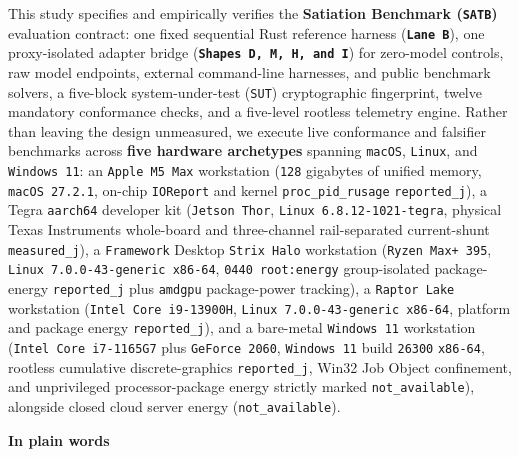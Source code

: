 \documentclass[10pt,letterpaper]{article}
\begin{document}
This study specifies and empirically verifies the \textbf{Satiation
Benchmark (\texttt{SATB})} evaluation contract: one fixed sequential
Rust reference harness (\textbf{\texttt{Lane\ B}}), one proxy-isolated
adapter bridge (\textbf{\texttt{Shapes\ D,\allowbreak{}\ M,\allowbreak{}\ H,\allowbreak{}\ and\ I}}) for
zero-model controls, raw model endpoints, external command-line
harnesses, and public benchmark solvers, a five-block system-under-test
(\texttt{SUT}) cryptographic fingerprint, twelve mandatory conformance
checks, and a five-level rootless telemetry engine. Rather than leaving
the design unmeasured, we execute live conformance and falsifier
benchmarks across \textbf{five hardware archetypes} spanning
\texttt{macOS}, \texttt{Linux}, and \texttt{Windows\ 11}: an
\texttt{Apple\ M5\ Max} workstation (\texttt{128} gigabytes of unified
memory, \texttt{macOS\ 27.\allowbreak{}2.\allowbreak{}1}, on-chip \texttt{IOReport} and kernel
\texttt{proc\_\allowbreak{}pid\_\allowbreak{}rusage} \texttt{reported\_\allowbreak{}j}), a Tegra
\texttt{aarch64} developer kit (\texttt{Jetson\ Thor},
\texttt{Linux\ 6.\allowbreak{}8.\allowbreak{}12-\allowbreak{}1021-\allowbreak{}tegra}, physical Texas Instruments
whole-board and three-channel rail-separated current-shunt
\texttt{measured\_\allowbreak{}j}), a \texttt{Framework} Desktop \texttt{Strix\ Halo}
workstation (\texttt{Ryzen\ Max+\ 395},
\texttt{Linux\ 7.\allowbreak{}0.\allowbreak{}0-\allowbreak{}43-\allowbreak{}generic\ x86-\allowbreak{}64}, \texttt{0440\ root:energy}
group-isolated package-energy \texttt{reported\_\allowbreak{}j} plus \texttt{amdgpu}
package-power tracking), a \texttt{Raptor\ Lake} workstation
(\texttt{Intel\ Core\ i9-\allowbreak{}13900H},
\texttt{Linux\ 7.\allowbreak{}0.\allowbreak{}0-\allowbreak{}43-\allowbreak{}generic\ x86-\allowbreak{}64}, platform and package energy
\texttt{reported\_\allowbreak{}j}), and a bare-metal \texttt{Windows\ 11} workstation
(\texttt{Intel\ Core\ i7-\allowbreak{}1165G7} plus \texttt{GeForce\ 2060},
\texttt{Windows\ 11} build \texttt{26300} \texttt{x86-64}, rootless
cumulative discrete-graphics \texttt{reported\_\allowbreak{}j}, Win32 Job Object
confinement, and unprivileged processor-package energy strictly marked
\texttt{not\_\allowbreak{}available}), alongside closed cloud server energy
(\texttt{not\_\allowbreak{}available}).

\textbf{In plain words}
\end{document}
